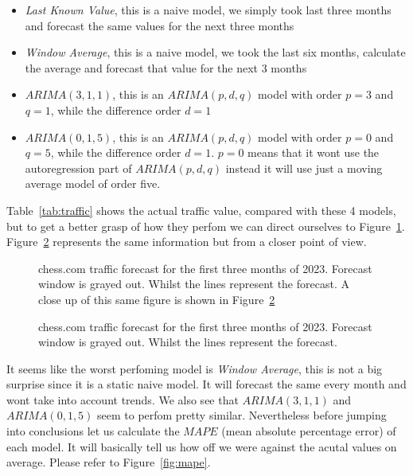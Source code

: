 \documentclass[journal]{IEEEtran}
\begin{document}
\begin{itemize}

    \item \emph{Last Known Value}, this is a naive model, we simply took last
        three months and forecast the same values for the next three months

    \item \emph{Window Average}, this is a naive model, we took the last six
        months, calculate the average and forecast that value for the next 3
        months 

    \item \emph{$ARIMA(3,1,1)$}, this is an $ARIMA(p,d,q)$  model with order
        $p=3$ and $q=1$, while the difference order $d=1$

    \item \emph{$ARIMA(0,1,5)$}, this is an $ARIMA(p,d,q)$  model with order
        $p=0$ and $q=5$, while the difference order $d=1$. $p=0$ means that it
        wont use the autoregression part of $ARIMA(p,d,q)$ instead it will use
        just a moving average model of order five.

\end{itemize}

Table~\ref{tab:traffic} shows the actual traffic value, compared with these 4
models, but to get a better grasp of how they perfom we can direct ourselves to
Figure~\ref{fig:forecast-large}. Figure~\ref{fig:forecast-zoom} represents the
same information but from a closer point of view.

\begin{figure}[htbp]
  \centering
  
    \caption{chess.com traffic forecast for the first three months of 2023.
    Forecast window is grayed out. Whilst the lines represent the forecast. A
    close up of this same figure is shown in Figure~\ref{fig:forecast-zoom}}
    \label{fig:forecast-large}
\end{figure}

\begin{figure}[htbp]
  \centering
  
    \caption{chess.com traffic forecast for the first three months of 2023.
    Forecast window is grayed out. Whilst the lines represent the forecast.}
    \label{fig:forecast-zoom}
\end{figure}

It seems like the worst perfoming model is \emph{Window Average}, this is not
a big surprise since it is a static naive model. It will forecast the same
every month and wont take into account trends. We also see that $ARIMA(3,1,1)$
and $ARIMA(0,1,5)$ seem to perfom pretty similar. Nevertheless before jumping
into conclusions let us calculate the $MAPE$ (mean absolute percentage error)
of each model. It will basically tell us how off we were against the acutal
values on average. Please refer to Figure~\ref{fig:mape}.
\end{document}
